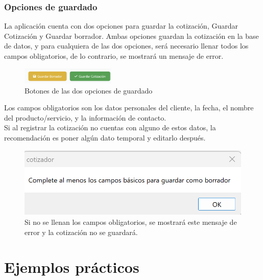 \documentclass{Pretexto/bluereport}
\begin{document}
\begin{minipage}
\subsubsection{Opciones de guardado}
La aplicación cuenta con dos opciones para guardar la cotización, Guardar Cotización y Guardar borrador.
Ambas opciones guardan la cotización en la base de datos, y para cualquiera de las dos opciones, será necesario
llenar todos los campos obligatorios, de lo contrario, se mostrará un mensaje de error. 
\begin{figure}[H]
    \centering
    \includegraphics[width=0.4\textwidth]{img/opciones_guardado.png}
    \caption{Botones de las dos opciones de guardado}
    \label{fig:opciones_guardado}
\end{figure}
Los campos obligatorios son 
los datos personales del cliente, la fecha, el nombre del producto/servicio, y la información de contacto.\\
 Si al registrar la cotización no cuentas con alguno de estos datos, la recomendación
 es poner algún dato temporal y editarlo después.
\begin{figure}[H] 
    \centering
        \includegraphics[width=0.35\linewidth]{img/mensaje_error.png}
    \caption{Si no se llenan los campos obligatorios, se mostrará este mensaje de error y la cotización no se guardará.}
    \label{fig:mensaje_error}
\end{figure}

\section{Ejemplos prácticos}

\end{minipage}
\end{document}
